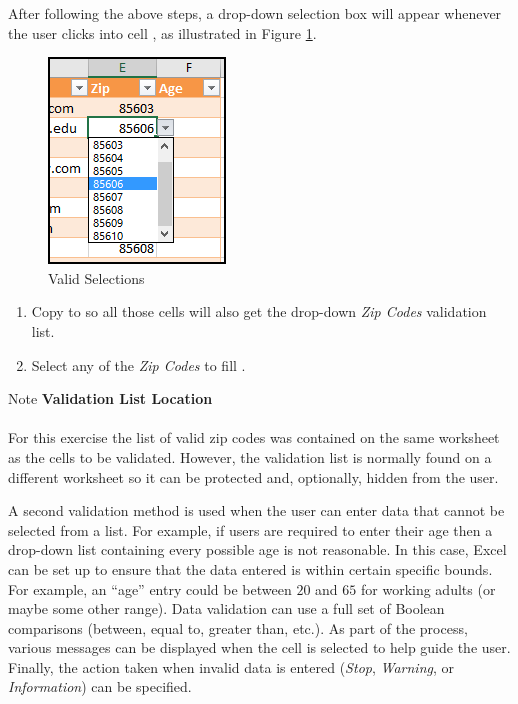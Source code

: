 After following the above steps, a drop-down selection box will appear whenever the user clicks into cell , as illustrated in Figure \ref{07:fig38}. 

\begin{figure}[H]
	\centering
	\includegraphics[width=\maxwidth{.95\linewidth}]{gfx/ch07_fig38}
	\caption{Valid Selections}
	\label{07:fig38}
\end{figure}

\begin{enumerate}[resume]
	\item Copy  to  so all those cells will also get the drop-down \textit{Zip Codes} validation list.
	\item Select any of the \textit{Zip Codes} to fill .
\end{enumerate}

\begin{center}
	\begin{infobox}{Note}
		\textbf{Validation List Location}
		\\
		\\
		For this exercise the list of valid zip codes was contained on the same worksheet as the cells to be validated. However, the validation list is normally found on a different worksheet so it can be protected and, optionally, hidden from the user.
	\end{infobox}
\end{center}

A second validation method is used when the user can enter data that cannot be selected from a list. For example, if users are required to enter their age then a drop-down list containing every possible age is not reasonable. In this case, Excel can be set up to ensure that the data entered is within certain specific bounds. For example, an ``age'' entry could be between $ 20 $ and $ 65 $ for working adults (or maybe some other range). Data validation can use a full set of Boolean comparisons (between, equal to, greater than, etc.). As part of the process, various messages can be displayed when the cell is selected to help guide the user. Finally, the action taken when invalid data is entered (\textit{Stop}, \textit{Warning}, or \textit{Information}) can be specified.

